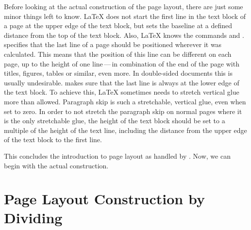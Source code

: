 \begin{Explain}
  Before looking at the actual construction of the page layout, there
  are just some minor things left to know. {\LaTeX} does not start the
  first line in the text block of a page at the upper edge of the text
  block, but sets the baseline at a defined distance from the top of
  the text block. Also, {\LaTeX} knows the commands
   and
  . 
  specifies that the last line of a page should be positioned wherever
  it was calculated. This means that the position of this line can be
  different on each page, up to the height of one line\,---\,in
  combination of the end of the page with titles, figures, tables or
  similar, even more. In double-sided documents this is usually
  undesirable.  makes sure that the last line is
  always at the lower edge of the text block. To achieve this,
  {\LaTeX} sometimes needs to stretch vertical glue more than
  allowed. Paragraph skip is such a stretchable, vertical glue, even
  when set to zero.  In order to not stretch the paragraph skip on
  normal pages where it is the only stretchable glue, the height of
  the text block should be set to a multiple of the height of the text
  line, including the distance from the upper edge of the text block
  to the first line.

  This concludes the introduction to page layout as handled by
  {\KOMAScript}. Now, we can begin with the actual construction.
\end{Explain}


\section{Page Layout Construction by Dividing}


